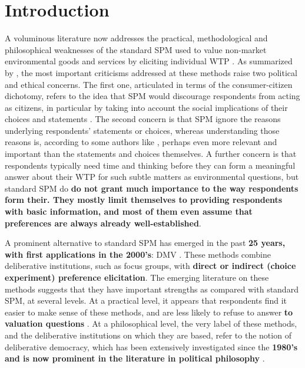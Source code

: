\documentclass[a4paper, 11pt]{article}
\begin{document}
\section{Introduction}
A voluminous literature now addresses the practical, methodological and philosophical weaknesses of the standard \ac{SPM} used to value non-market environmental goods and services by eliciting individual \ac{WTP} \citep{meinard_ethical_2016}. 
As summarized by \citet{bartkowski_beyond_2018, bartkowski_deliberative_2019}, the most important criticisms addressed at these methods raise two political and ethical concerns. 
The first one, articulated in terms of the consumer-citizen dichotomy, refers to the idea that \ac{SPM} would discourage respondents from acting as citizens, in particular by taking into account the social implications of their choices and statements \citep{soma_representing_2014, vatn_institutional_2009}. 
The second concern is that \ac{SPM} ignore the reasons underlying respondents’ statements or choices, whereas understanding those reasons is, according to some authors like \citet{sen_environmental_1995}, perhaps even more relevant and important than the statements and choices themselves. A further concern is that respondents typically need time and thinking before they can form a meaningful answer about their \ac{WTP} for such subtle matters as environmental questions, but standard \ac{SPM} do \textbf{do not grant much importance to the way respondents form their. They mostly limit themselves to providing respondents with basic information, and most of them even assume that preferences are always already well-established}.

A prominent alternative to standard \ac{SPM} has emerged in the past \textbf{25 years, with first applications in the 2000's}: \ac{DMV} \citep{spash_deliberative_2007,bartkowski_economic_2017}. 
These methods combine deliberative institutions, such as focus groups, with \textbf{direct or indirect (choice experiment) preference elicitation}. 
The emerging literature on these methods suggests that they have important strengths as compared with standard \ac{SPM}, at several levels. 
At a practical level, it appears that respondents find it easier to make sense of these methods, and are less likely to refuse to answer \textbf{to valuation questions} \citep{lienhoop_contingent_2007,szabo_reducing_2011}. 
At a philosophical level, the very label of these methods, and the deliberative institutions on which they are based, refer to the notion of deliberative democracy, which has been extensively investigated since the \textbf{1980's and is now prominent in the literature in political philosophy} \citep{chappell_deliberative_2012}.
\end{document}
